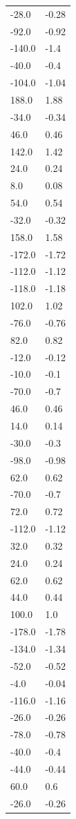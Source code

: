 \begin{longtable}{ll}
-28.0 & -0.28 \\
-92.0 & -0.92 \\
-140.0 & -1.4 \\
-40.0 & -0.4 \\
-104.0 & -1.04 \\
188.0 & 1.88 \\
-34.0 & -0.34 \\
46.0 & 0.46 \\
142.0 & 1.42 \\
24.0 & 0.24 \\
8.0 & 0.08 \\
54.0 & 0.54 \\
-32.0 & -0.32 \\
158.0 & 1.58 \\
-172.0 & -1.72 \\
-112.0 & -1.12 \\
-118.0 & -1.18 \\
102.0 & 1.02 \\
-76.0 & -0.76 \\
82.0 & 0.82 \\
-12.0 & -0.12 \\
-10.0 & -0.1 \\
-70.0 & -0.7 \\
46.0 & 0.46 \\
14.0 & 0.14 \\
-30.0 & -0.3 \\
-98.0 & -0.98 \\
62.0 & 0.62 \\
-70.0 & -0.7 \\
72.0 & 0.72 \\
-112.0 & -1.12 \\
32.0 & 0.32 \\
24.0 & 0.24 \\
62.0 & 0.62 \\
44.0 & 0.44 \\
100.0 & 1.0 \\
-178.0 & -1.78 \\
-134.0 & -1.34 \\
-52.0 & -0.52 \\
-4.0 & -0.04 \\
-116.0 & -1.16 \\
-26.0 & -0.26 \\
-78.0 & -0.78 \\
-40.0 & -0.4 \\
-44.0 & -0.44 \\
60.0 & 0.6 \\
-26.0 & -0.26 \\

\end{longtable}
